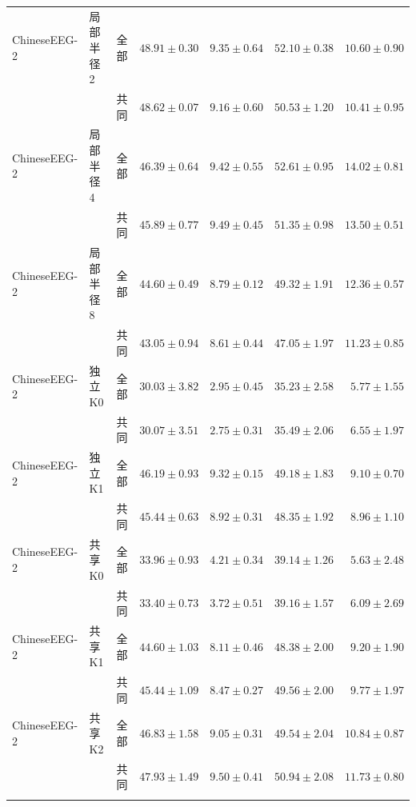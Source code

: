 \begin{longtable}{@{}lllrrrr@{}}
\addlinespace
ChineseEEG-2 & 局部半径 2 & 全部 & $48.91\pm0.30$ & $9.35\pm0.64$ & $52.10\pm0.38$ & $10.60\pm0.90$ \\
 &  & 共同 & $48.62\pm0.07$ & $9.16\pm0.60$ & $50.53\pm1.20$ & $10.41\pm0.95$ \\
\addlinespace
ChineseEEG-2 & 局部半径 4 & 全部 & $46.39\pm0.64$ & $9.42\pm0.55$ & $52.61\pm0.95$ & $14.02\pm0.81$ \\
 &  & 共同 & $45.89\pm0.77$ & $9.49\pm0.45$ & $51.35\pm0.98$ & $13.50\pm0.51$ \\
\addlinespace
ChineseEEG-2 & 局部半径 8 & 全部 & $44.60\pm0.49$ & $8.79\pm0.12$ & $49.32\pm1.91$ & $12.36\pm0.57$ \\
 &  & 共同 & $43.05\pm0.94$ & $8.61\pm0.44$ & $47.05\pm1.97$ & $11.23\pm0.85$ \\
\addlinespace
ChineseEEG-2 & 独立 K0 & 全部 & $30.03\pm3.82$ & $2.95\pm0.45$ & $35.23\pm2.58$ & $5.77\pm1.55$ \\
 &  & 共同 & $30.07\pm3.51$ & $2.75\pm0.31$ & $35.49\pm2.06$ & $6.55\pm1.97$ \\
\addlinespace
ChineseEEG-2 & 独立 K1 & 全部 & $46.19\pm0.93$ & $9.32\pm0.15$ & $49.18\pm1.83$ & $9.10\pm0.70$ \\
 &  & 共同 & $45.44\pm0.63$ & $8.92\pm0.31$ & $48.35\pm1.92$ & $8.96\pm1.10$ \\
\addlinespace
ChineseEEG-2 & 共享 K0 & 全部 & $33.96\pm0.93$ & $4.21\pm0.34$ & $39.14\pm1.26$ & $5.63\pm2.48$ \\
 &  & 共同 & $33.40\pm0.73$ & $3.72\pm0.51$ & $39.16\pm1.57$ & $6.09\pm2.69$ \\
\addlinespace
ChineseEEG-2 & 共享 K1 & 全部 & $44.60\pm1.03$ & $8.11\pm0.46$ & $48.38\pm2.00$ & $9.20\pm1.90$ \\
 &  & 共同 & $45.44\pm1.09$ & $8.47\pm0.27$ & $49.56\pm2.00$ & $9.77\pm1.97$ \\
\addlinespace
ChineseEEG-2 & 共享 K2 & 全部 & $46.83\pm1.58$ & $9.05\pm0.31$ & $49.54\pm2.04$ & $10.84\pm0.87$ \\
 &  & 共同 & $47.93\pm1.49$ & $9.50\pm0.41$ & $50.94\pm2.08$ & $11.73\pm0.80$ \\
\addlinespace
\end{longtable}
\endgroup
